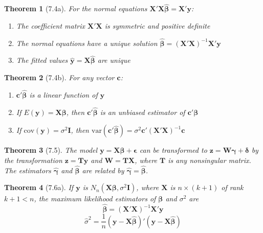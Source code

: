 \documentclass{article}
\newtheorem{theorem}{Theorem}[section]
\begin{document}
\begin{theorem}[7.4a]
For the normal equations $\mathbf{X}'\mathbf{X}\hat{\boldsymbol{\beta}} = \mathbf{X}'\mathbf{y}$:
\begin{enumerate}[label=(\roman*)]
\item The coefficient matrix $\mathbf{X}'\mathbf{X}$ is symmetric and positive definite
\item The normal equations have a unique solution $\hat{\boldsymbol{\beta}} = (\mathbf{X}'\mathbf{X})^{-1}\mathbf{X}'\mathbf{y}$
\item The fitted values $\hat{\mathbf{y}} = \mathbf{X}\hat{\boldsymbol{\beta}}$ are unique
\end{enumerate}
\end{theorem}


\begin{theorem}[7.4b]
For any vector $\mathbf{c}$:
\begin{enumerate}[label=(\roman*)]
\item $\mathbf{c}'\hat{\boldsymbol{\beta}}$ is a linear function of $\mathbf{y}$
\item If $E(\mathbf{y}) = \mathbf{X}\boldsymbol{\beta}$, then $\mathbf{c}'\hat{\boldsymbol{\beta}}$ is an unbiased estimator of $\mathbf{c}'\boldsymbol{\beta}$
\item If $\text{cov}(\mathbf{y}) = \sigma^2\mathbf{I}$, then $\text{var}(\mathbf{c}'\hat{\boldsymbol{\beta}}) = \sigma^2\mathbf{c}'(\mathbf{X}'\mathbf{X})^{-1}\mathbf{c}$
\end{enumerate}
\end{theorem}

\begin{theorem}[7.5]
The model $\mathbf{y} = \mathbf{X}\boldsymbol{\beta} + \boldsymbol{\epsilon}$ can be transformed to $\mathbf{z} = \mathbf{W}\boldsymbol{\gamma} + \boldsymbol{\delta}$ by the transformation $\mathbf{z} = \mathbf{T}\mathbf{y}$ and $\mathbf{W} = \mathbf{T}\mathbf{X}$, where $\mathbf{T}$ is any nonsingular matrix. The estimators $\hat{\boldsymbol{\gamma}}$ and $\hat{\boldsymbol{\beta}}$ are related by $\hat{\boldsymbol{\gamma}} = \hat{\boldsymbol{\beta}}$.
\end{theorem}

\begin{theorem}[7.6a]
If $\mathbf{y}$ is $N_n(\mathbf{X}\boldsymbol{\beta}, \sigma^2\mathbf{I})$, where $\mathbf{X}$ is $n \times (k+1)$ of rank $k+1 < n$, the maximum likelihood estimators of $\boldsymbol{\beta}$ and $\sigma^2$ are
\[\hat{\boldsymbol{\beta}} = (\mathbf{X}'\mathbf{X})^{-1}\mathbf{X}'\mathbf{y}\]
\[\hat{\sigma}^2 = \frac{1}{n}(\mathbf{y} - \mathbf{X}\hat{\boldsymbol{\beta}})' (\mathbf{y} - \mathbf{X}\hat{\boldsymbol{\beta}})\]
\end{theorem}
\end{document}
